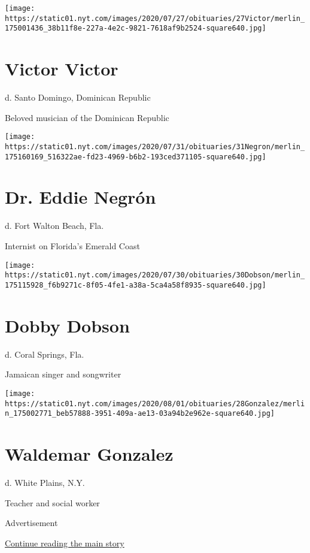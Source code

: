 \texttt{[image: https://static01.nyt.com/images/2020/07/27/obituaries/27Victor/merlin\_175001436\_38b11f8e-227a-4e2c-9821-7618af9b2524-square640.jpg]}

\hypertarget{victor-victor}{%
\section{Victor Victor}\label{victor-victor}}

d. Santo Domingo, Dominican Republic

Beloved musician of the Dominican Republic

\texttt{[image: https://static01.nyt.com/images/2020/07/31/obituaries/31Negron/merlin\_175160169\_516322ae-fd23-4969-b6b2-193ced371105-square640.jpg]}

\hypertarget{dr-eddie-negruxf3n}{%
\section{Dr. Eddie Negrón}\label{dr-eddie-negruxf3n}}

d. Fort Walton Beach, Fla.

Internist on Florida's Emerald Coast

\texttt{[image: https://static01.nyt.com/images/2020/07/30/obituaries/30Dobson/merlin\_175115928\_f6b9271c-8f05-4fe1-a38a-5ca4a58f8935-square640.jpg]}

\hypertarget{dobby-dobson}{%
\section{Dobby Dobson}\label{dobby-dobson}}

d. Coral Springs, Fla.

Jamaican singer and songwriter

\texttt{[image: https://static01.nyt.com/images/2020/08/01/obituaries/28Gonzalez/merlin\_175002771\_beb57888-3951-409a-ae13-03a94b2e962e-square640.jpg]}

\hypertarget{waldemar-gonzalez}{%
\section{Waldemar Gonzalez}\label{waldemar-gonzalez}}

d. White Plains, N.Y.

Teacher and social worker

Advertisement

\protect\hyperlink{after-bottom}{Continue reading the main story}

